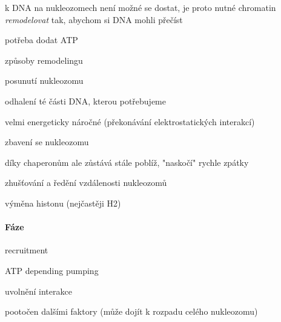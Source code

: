 \documentclass[DIV=8]{scrreprt}
\begin{document}
\begin{myItemize}[nosep]
    \item k DNA na nukleozomech není možné se dostat, je proto nutné chromatin \emph{remodelovat} tak, abychom si DNA mohli přečíst
    \item potřeba dodat ATP
    \item způsoby remodelingu
\begin{myItemize}[nosep]
    \item posunutí nukleozomu
\begin{myItemize}[nosep]
    \item odhalení té části DNA, kterou potřebujeme
    \item velmi energeticky náročné (překonávání elektrostatických interakcí)
\end{myItemize}

    \item zbavení se nukleozomu
\begin{myItemize}[nosep]
    \item díky chaperonům ale zůstává stále poblíž, "naskočí" rychle zpátky
\end{myItemize}

    \item zhušťování a ředění vzdálenosti nukleozomů
    \item výměna histonu (nejčastěji H2)
\end{myItemize}

\end{myItemize}



\paragraph{Fáze}
\begin{myEnumerate}[nosep]
    \item recruitment
    \item ATP depending pumping
    \item uvolnění interakce
    \item pootočen dalšími faktory (může dojít k rozpadu celého nukleozomu)
\end{myEnumerate}
\end{document}
